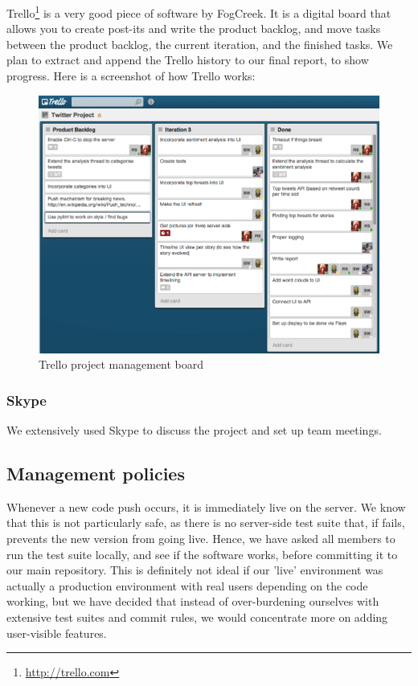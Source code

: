 \documentclass[a4paper,12pt]{article}
\begin{document}
			Trello\footnote{\url{http://trello.com}} is a very good piece of software by FogCreek. It is a digital board that allows you to create post-its and write the product backlog, and move tasks between the product backlog, the current iteration, and the finished tasks. We plan to extract and append the Trello history to our final report, to show progress. Here is a screenshot of how Trello works:
			
			\begin{figure}[ht!]
						\centering
							\includegraphics[scale=0.4]{trello1.png}
						\caption{Trello project management board}
			\end{figure}
			
			\subsubsection{Skype}
			
			We extensively used Skype to discuss the project and set up team meetings.
		
		\subsection{Management policies}
		
		Whenever a new code push occurs, it is immediately live on the server. We know that this is not particularly safe, as there is no server-side test suite that, if fails, prevents the new version from going live. Hence, we have asked all members to run the test suite locally, and see if the software works, before committing it to our main repository. This is definitely not ideal if our 'live' environment was actually a production environment with real users depending on the code working, but we have decided that instead of over-burdening ourselves with extensive test suites and commit rules, we would concentrate more on adding user-visible features.
		
\end{document}
